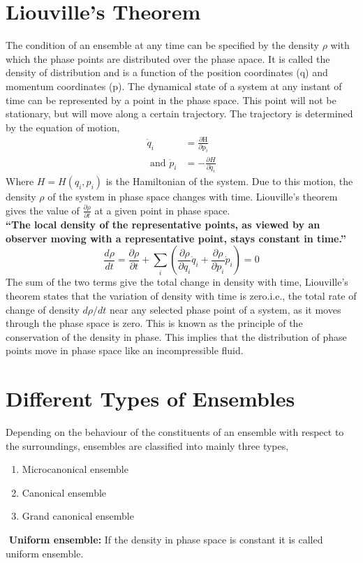 \section{Liouville's Theorem}
The condition of an ensemble at any time can be specified by the density $\rho$ with which the phase points are distributed over the phase apace.  It is called the density of distribution and is a function of the position coordinates (q) and momentum coordinates (p).
The dynamical state of a system at any instant of time can be represented by a point in the phase space.  This point will not be stationary, but will move along a certain trajectory. The trajectory is determined by the equation of motion,
\begin{align}
\dot{q}_{i}&=\frac{\partial \mathrm{H}}{\partial \mathrm{p}_{i}}\\
\text{ and } \dot{p}_{i}&=-\frac{\partial H}{\partial \dot{q}_{i}}
\end{align}
Where $H=H\left(q_{i}, p_{i}\right)$ is the Hamiltonian of the system. Due to this motion, the density $\rho$ of the system in phase space changes with time.
Liouville's theorem gives the value of $\frac{\partial \rho}{\partial t}$ at a given point in phase space.\\
\textbf{``The local density of the representative points, as viewed by an observer moving with a representative point, stays constant in time.''}
\begin{equation}
\frac{d \rho}{d t}=\frac{\partial \rho}{\partial t}+\sum_{i}\left(\frac{\partial \rho}{\partial q_{i}} \dot{q}_{i}+\frac{\partial \rho}{\partial p_{i}} \dot{p}_{i}\right)=0
\end{equation}
The sum of the two terms give the total change in density with time, Liouville's theorem states that the variation of density with time is zero.i.e., the total rate of change of density $d\rho/dt$ near any selected phase point of a system, as it moves through the phase space is zero.
This is known as the principle of the conservation of the density in phase.  This implies that the distribution of phase points move in phase space like an incompressible fluid.\\
\section{Different Types of Ensembles}
Depending on the behaviour of the constituents of an ensemble with respect to the surroundings, ensembles are classified into mainly three types,
\begin{enumerate}
	\item Microcanonical ensemble
	\item Canonical ensemble
	\item Grand canonical ensemble
\end{enumerate} 
\begin{note}
	$\left. \right. $ \textbf{Uniform ensemble: }If the density in phase space is constant it is called uniform ensemble.
\end{note}

